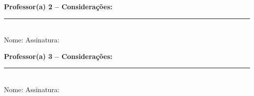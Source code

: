 \documentclass[a4paper,12pt]{article}
\begin{document}
\vspace{20cm}
\noindent\textbf{Professor(a) 2 – Considerações:}\\[3cm]
\noindent\rule{\linewidth}{0.5pt}\\
\noindent Nome: \hfill Assinatura: \hspace{4cm}

\vspace{20cm}
\noindent\textbf{Professor(a) 3 – Considerações:}\\[3cm]
\noindent\rule{\linewidth}{0.5pt}\\
\noindent Nome: \hfill Assinatura: \hspace{4cm}
\end{document}
